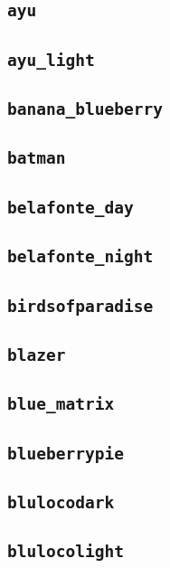 \subsection{\texttt{ayu}}
\newpage
\subsection{\texttt{ayu\_light}}
\newpage
\subsection{\texttt{banana\_blueberry}}
\newpage
\subsection{\texttt{batman}}
\newpage
\subsection{\texttt{belafonte\_day}}
\newpage
\subsection{\texttt{belafonte\_night}}
\newpage
\subsection{\texttt{birdsofparadise}}
\newpage
\subsection{\texttt{blazer}}
\newpage
\subsection{\texttt{blue\_matrix}}
\newpage
\subsection{\texttt{blueberrypie}}
\newpage
\subsection{\texttt{blulocodark}}
\newpage
\subsection{\texttt{blulocolight}}
\newpage
